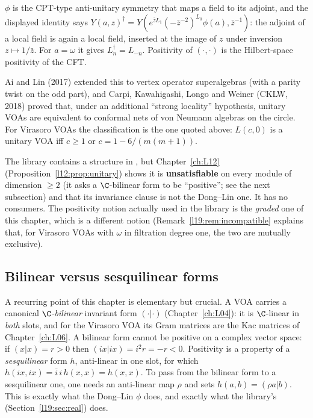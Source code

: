 \begin{physics}
$\phi$ is the CPT-type anti-unitary symmetry that maps a field to its adjoint, and the displayed
identity says $Y(a,z)^\dagger = Y(e^{\bar zL_1}(-\bar z^{-2})^{L_0}\phi(a),\bar z^{-1})$: the
adjoint of a local field is again a local field, inserted at the image of $z$ under inversion
$z\mapsto 1/\bar z$. For $a=\omega$ it gives $L_n^\dagger = L_{-n}$. Positivity of $(\cdot,\cdot)$ is
the Hilbert-space positivity of the CFT.
\end{physics}

Ai and Lin (2017) extended this to vertex operator superalgebras (with a parity twist on the odd
part), and Carpi, Kawahigashi, Longo and Weiner (CKLW, 2018) proved that, under an additional
``strong locality'' hypothesis, unitary VOAs are equivalent to conformal nets of von Neumann
algebras on the circle. For Virasoro VOAs the classification is the one quoted above:
$L(c,0)$ is a unitary VOA iff $c\ge1$ or $c = 1-6/(m(m+1))$.

\begin{warning}[title={The library has no Dong--Lin unitarity}]\label{l19:warn:nodonglin}
The library contains a structure  in ,
but Chapter~\ref{ch:L12} (Proposition~\ref{l12:prop:unitary}) shows it is \textbf{unsatisfiable} on every
module of dimension $\ge2$ (it asks a $\C$-bilinear form to be ``positive''; see the next
subsection) and that its invariance clause is not the Dong--Lin one. It has no consumers. The
positivity notion actually used in the library is the \emph{graded} one of this chapter, which is a
different notion (Remark~\ref{l19:rem:incompatible} explains that, for Virasoro VOAs with
$\omega$ in filtration degree one, the two are mutually exclusive).
\end{warning}

\subsection{Bilinear versus sesquilinear forms}

A recurring point of this chapter is elementary but crucial. A VOA carries a canonical
\emph{$\C$-bilinear} invariant form $(\cdot|\cdot)$ (Chapter~\ref{ch:L04}): it is
$\C$-linear in \emph{both} slots, and for the Virasoro VOA its Gram matrices are the Kac matrices of
Chapter~\ref{ch:L06}. A bilinear form cannot be positive on a complex vector space: if
$(x|x) = r>0$ then $(ix|ix) = i^2r = -r<0$. Positivity is a property of a \emph{sesquilinear}
form $h$, anti-linear in one slot, for which $h(ix,ix) = \bar i\,i\,h(x,x) = h(x,x)$. To pass from
the bilinear form to a sesquilinear one, one needs an anti-linear map $\rho$ and sets
$h(a,b) = (\rho a|b)$. This is exactly what the Dong--Lin $\phi$ does, and exactly what the
library's  (Section~\ref{l19:sec:real}) does.

